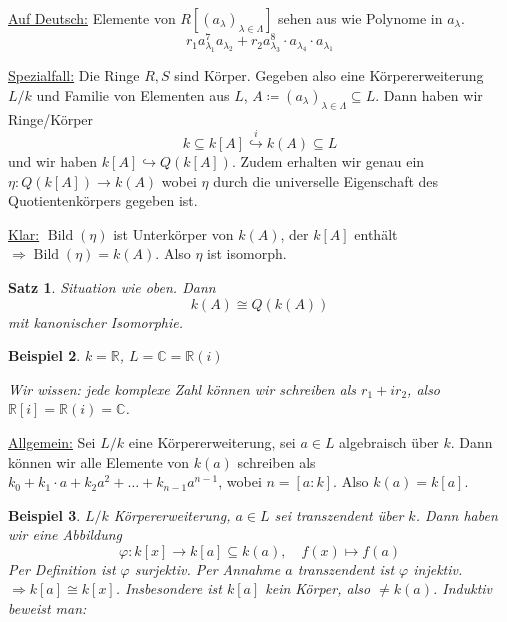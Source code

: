 \documentclass[a4paper,12pt,numbers=noenddot,parskip=full]{scrartcl}
\newcommand{\setR}{\mathbb{R}}
\newcommand{\setC}{\mathbb{C}}
\newcommand{\heading}{\underline}
\theoremstyle{dotless}
\newtheorem{theorem}{Satz}[section]
\newtheorem{example}[theorem]{Beispiel}
\theoremstyle{remark}
\begin{document}
	\heading{Auf Deutsch:} Elemente von $R[(a_\lambda)_{\lambda \in \Lambda}]$ sehen aus wie Polynome in $a_\lambda$.
	\begin{equation*}
		r_1 a_{\lambda_1}^7 a_{\lambda_2} + r_2 a_{\lambda_3}^8 \cdot a_{\lambda_4} \cdot a_{\lambda_1}
	\end{equation*}
	
	\heading{Spezialfall:} Die Ringe $R,S$ sind Körper. Gegeben also eine Körpererweiterung $L/k$ und Familie von Elementen aus $L$, $A \coloneqq (a_\lambda)_{\lambda \in \Lambda} \subseteq L$. Dann haben wir Ringe/Körper
	\begin{equation*}
		k \subseteq k[A] \overset{i}{\hookrightarrow} k(A) \subseteq L
	\end{equation*}
	und wir haben $k[A] \hookrightarrow Q(k[A])$. Zudem erhalten wir genau ein $\eta: Q(k[A]) \to k(A)$ wobei $\eta$ durch die universelle Eigenschaft des Quotientenkörpers gegeben ist.
	
	\heading{Klar:} $\operatorname{Bild}(\eta)$ ist Unterkörper von $k(A)$, der $k[A]$ enthält $\Rightarrow \operatorname{Bild}(\eta) = k(A)$. Also $\eta$ ist isomorph.
	
	\begin{theorem}
		Situation wie oben. Dann
		\begin{equation*}
			k(A) \cong Q(k(A))
		\end{equation*}
		mit kanonischer Isomorphie.
	\end{theorem}

	\begin{example}
		$k = \setR$, $L = \setC = \setR(i)$
		
		Wir wissen: jede komplexe Zahl können wir schreiben als $r_1 + i r_2$, also $\setR[i] = \setR(i) = \setC$.
	\end{example}

	\heading{Allgemein:} Sei $L/k$ eine Körpererweiterung, sei $a \in L$ algebraisch über $k$. Dann können wir alle Elemente von $k(a)$ schreiben als $k_0 + k_1 \cdot a + k_2 a^2 + \dots + k_{n-1} a^{n-1}$, wobei $n = [a : k]$. Also $k(a) = k[a]$.
	
	\begin{example}
		$L/k$ Körpererweiterung, $a \in L$ sei transzendent über $k$. Dann haben wir eine Abbildung
		\begin{equation*}
			\varphi :k[x] \to k[a] \subseteq k(a), \quad f(x) \mapsto f(a)
		\end{equation*}
		Per Definition ist $\varphi$ surjektiv. Per Annahme $a$ transzendent ist $\varphi$ injektiv. $\Rightarrow k[a] \cong k[x]$. Insbesondere ist $k[a]$ kein Körper, also $\neq k(a)$. Induktiv beweist man:
	\end{example}
\end{document}
